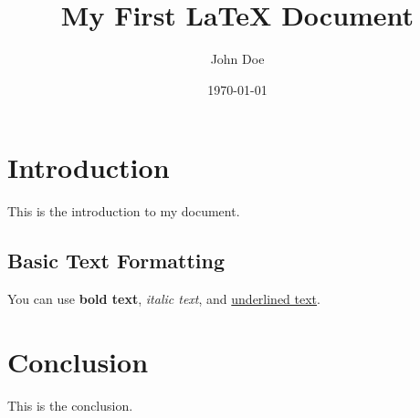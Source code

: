 \documentclass{article} %
\title{My First LaTeX Document}
\author{John Doe}
\date{\today} %
\begin{document}

\maketitle %

\section{Introduction}
This is the introduction to my document.

\subsection{Basic Text Formatting}
You can use \textbf{bold text}, \textit{italic text}, and \underline{underlined text}.

\section{Conclusion}
This is the conclusion.
\end{document}
